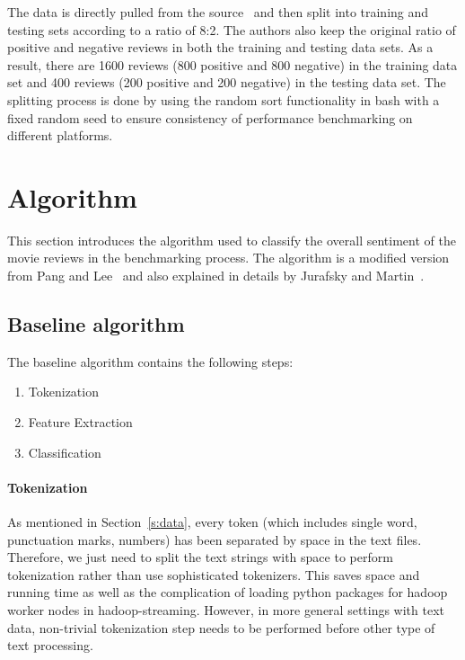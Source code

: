 The data is directly pulled from the
source~\cite{hid-sp18-405-sentiment-data} and then split into training
and testing sets according to a ratio of 8:2. The authors also keep
the original ratio of positive and negative reviews in both the
training and testing data sets. As a result, there are 1600 reviews
(800 positive and 800 negative) in the training data set and 400
reviews (200 positive and 200 negative) in the testing data set. The
splitting process is done by using the random sort functionality in
bash with a fixed random seed to ensure consistency of performance
benchmarking on different platforms.


\section{Algorithm}\label{s:algorithm}

This section introduces the algorithm used to classify the overall
sentiment of the movie reviews in the benchmarking process. The
algorithm is a modified version from Pang and
Lee~\cite{hid-sp18-405-sentiment-pang2004asentimental} and also
explained in details by Jurafsky and
Martin~\cite{hid-sp18-405-sentiment-jurafsky2009}.

\subsection{Baseline algorithm}\label{ss:base}

The baseline algorithm contains the following steps:

\begin{enumerate}
	\item Tokenization
	\item Feature Extraction
	\item Classification
\end{enumerate}

\paragraph{Tokenization}
As mentioned in Section~\ref{s:data}, every token (which includes
single word, punctuation marks, numbers) has been separated by space
in the text files. Therefore, we just need to split the text strings
with space to perform tokenization rather than use sophisticated
tokenizers. This saves space and running time as well as the
complication of loading python packages for hadoop worker nodes in
hadoop-streaming. However, in more general settings with text data,
non-trivial tokenization step needs to be performed before other type
of text processing.

